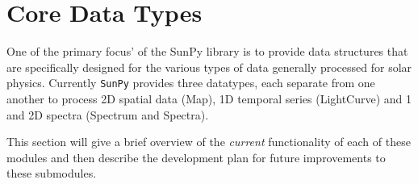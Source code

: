 \section{Core Data Types}
One of the primary focus' of the SunPy library is to provide data structures 
that are 
specifically designed for the various types of data generally processed for 
solar physics. Currently \texttt{SunPy} provides three datatypes, each separate 
from one another to process 2D spatial data (Map), 1D temporal series 
(LightCurve) and 1 and 2D spectra (Spectrum and Spectra).

This section will give a brief overview of the \textit{current} functionality 
of each of these modules and then describe the development plan for future 
improvements to these submodules.



